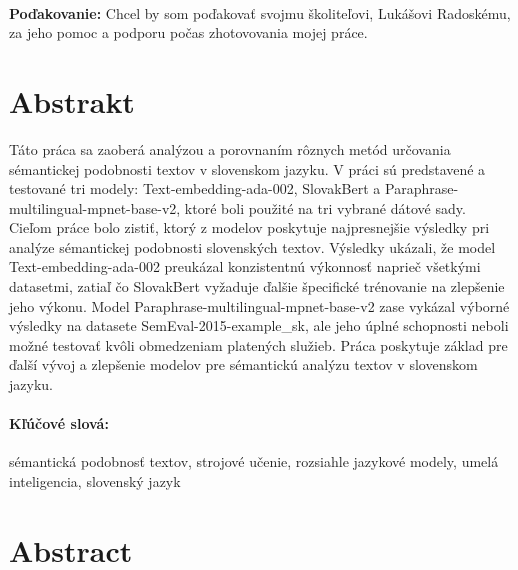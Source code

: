 \documentclass[12pt, twoside]{book}
\begin{document}


\newpage 
\pagestyle{plain}
~

\vfill
{\bf Poďakovanie:} Chcel by som poďakovať svojmu školiteľovi, Lukášovi Radoskému, za jeho pomoc a podporu počas zhotovovania mojej práce. 


\newpage 
\section*{Abstrakt}

Táto práca sa zaoberá analýzou a porovnaním rôznych metód určovania sémantickej podobnosti textov v slovenskom jazyku. V práci sú predstavené a testované tri modely: Text-embedding-ada-002, SlovakBert a Paraphrase-multilingual-mpnet-base-v2, ktoré boli použité na tri vybrané dátové sady. Cieľom práce bolo zistiť, ktorý z modelov poskytuje najpresnejšie výsledky pri analýze sémantickej podobnosti slovenských textov. Výsledky ukázali, že model Text-embedding-ada-002 preukázal konzistentnú výkonnosť naprieč všetkými datasetmi, zatiaľ čo SlovakBert vyžaduje ďalšie špecifické trénovanie na zlepšenie jeho výkonu. Model Paraphrase-multilingual-mpnet-base-v2 zase vykázal výborné výsledky na datasete SemEval-2015-example\_sk, ale jeho úplné schopnosti neboli možné testovať kvôli obmedzeniam platených služieb. Práca poskytuje základ pre ďalší vývoj a zlepšenie modelov pre sémantickú analýzu textov v slovenskom jazyku.


\paragraph*{Kľúčové slová:} sémantická podobnosť textov, strojové učenie, rozsiahle jazykové modely, umelá inteligencia, slovenský jazyk


\newpage 
\section*{Abstract}
\end{document}
